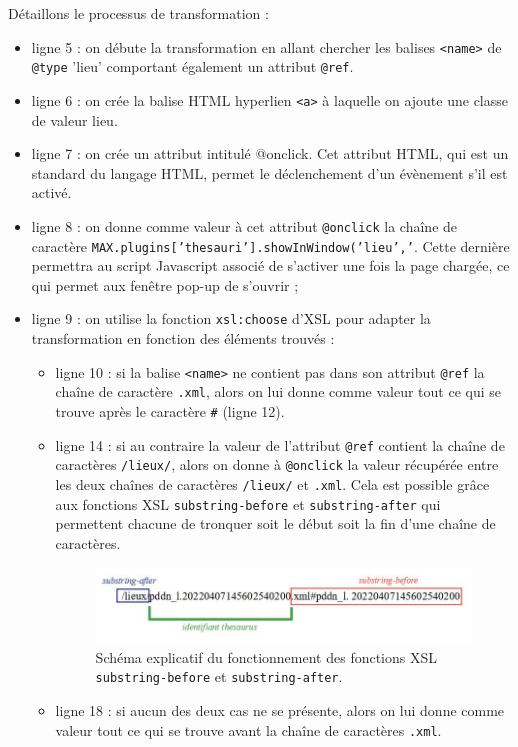 \documentclass[a4paper,12pt,twoside]{book}
\begin{document}
Détaillons le processus de transformation \label{thesau_xsl}:
\begin{itemize}
    \item ligne 5 : on débute la transformation en allant chercher les balises \texttt{<name>} de \texttt{@type} 'lieu' comportant également un attribut \texttt{@ref}.
    \item ligne 6 : on crée la balise \acrshort{HTML} hyperlien \texttt{<a>} à laquelle on ajoute une classe de valeur \og lieu\fg.
    \item ligne 7 : on crée un attribut intitulé @onclick. Cet attribut \acrshort{HTML}, qui est un standard du langage \acrshort{HTML}, permet le déclenchement d'un évènement s'il est activé.
    \item ligne 8 : on donne comme valeur à cet attribut \texttt{@onclick} la chaîne de caractère \texttt{MAX.plugins['thesauri'].showInWindow('lieu','}. Cette dernière permettra au script Javascript associé de s'activer une fois la page chargée, ce qui permet aux fenêtre pop-up de s'ouvrir ;
    \item ligne 9 : on utilise la fonction \texttt{xsl:choose} d'\acrshort{XSL} pour adapter la transformation en fonction des éléments trouvés :
    \begin{itemize}
    \item ligne 10 : si la balise \texttt{<name>} ne contient pas dans son attribut \texttt{@ref} la chaîne de caractère \texttt{.xml}, alors on lui donne comme valeur tout ce qui se trouve après le caractère \texttt{\#} (ligne 12).
    \item ligne 14 : si au contraire la valeur de l'attribut \texttt{@ref} contient la chaîne de caractères \texttt{/lieux/}, alors on donne à \texttt{@onclick} la valeur récupérée entre les deux chaînes de caractères \texttt{/lieux/} et \texttt{.xml}. Cela est possible grâce aux fonctions \acrshort{XSL} \texttt{substring-before} et \texttt{substring-after} qui permettent chacune de tronquer soit le début soit la fin d'une chaîne de caractères.
    
    \begin{figure}[H]
        \centering
        \includegraphics[width=13cm]{img/partie_3/lundey_thesau.JPG}
        \caption{Schéma explicatif du fonctionnement des fonctions \acrshort{XSL} \texttt{substring-before} et \texttt{substring-after}.}
    \end{figure}
    
    \item ligne 18 : si aucun des deux cas ne se présente, alors on lui donne comme valeur tout ce qui se trouve avant la chaîne de caractères \texttt{.xml}.
    \end{itemize}
\end{itemize}
\end{document}
